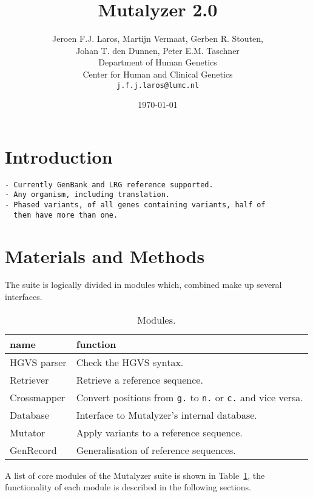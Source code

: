 \documentclass{article}
\title{\Huge Mutalyzer 2.0}
\author{Jeroen F.J. Laros, Martijn Vermaat, Gerben R. Stouten,\\
  Johan T. den Dunnen, Peter E.M. Taschner
  \vspace{10pt}\\
  Department of Human Genetics\\
  Center for Human and Clinical Genetics\\
  \texttt{j.f.j.laros@lumc.nl}}
\date{\today}
\begin{document}
\maketitle

\begin{abstract} \noindent
\end{abstract}

\section{Introduction}\label{introduction}
\cite{Mutalyzer}
\cite{HGVS}

\begin{verbatim}
- Currently GenBank and LRG reference supported.
- Any organism, including translation.
- Phased variants, of all genes containing variants, half of
  them have more than one.
\end{verbatim}

\section{Materials and Methods}
The suite is logically divided in modules which, combined make up several
interfaces.

\begin{table}[]
  \caption{Modules.}
  \label{tab:modules}
  \begin{center}
    \begin{tabular}{l|l}
      name           & function\\
      \hline
      HGVS parser    & Check the HGVS syntax.\\
      Retriever      & Retrieve a reference sequence.\\
      Cross\-mapper    & Convert positions from \texttt{g.} to \texttt{n.} or
        \texttt{c.} and vice versa.\\
      Database       & Interface to Mutalyzer's internal database.\\
      Mutator        & Apply variants to a reference sequence.\\
      GenRecord      & Generalisation of reference sequences.\\
    \end{tabular}
  \end{center}
\end{table}

A list of core modules of the Mutalyzer suite is shown in
Table~\ref{tab:modules}, the functionality of each module is described in the
following sections.
\end{document}
